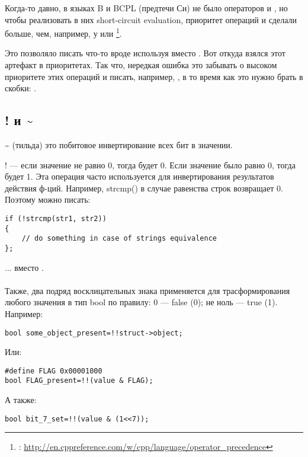 Когда-то давно\cite{dmr:1995}, в языках B и BCPL (предтечи Си) не было операторов \IT{\&\&} и \IT{||}, 
но чтобы реализовать в них
short-circuit evaluation, приоритет операций \IT{\&} и \IT{|} сделали больше, чем, например, у \IT{\^} или \IT{+}
\footnote{: \url{http://en.cppreference.com/w/cpp/language/operator_precedence}}.

Это позволяло писать что-то вроде  используя \IT{\&} вместо \IT{\&\&}. Вот откуда взялся
этот артефакт в приоритетах.
Так что, нередкая ошибка это забывать о высоком приоритете этих операций и писать, например,
, в то время как это нужно брать в скобки: .

\subsection{! и \~{}}

\~{} (тильда) это побитовое инвертирование всех бит в значении.

! --- если значение не равно 0, тогда будет 0. Если значение было равно 0, тогда будет 1. Эта операция часто
используется для инвертирования результатов действия ф-ций. Например, strcmp() в случае равенства строк возвращает 0.
Поэтому можно писать:

\begin{lstlisting}
if (!strcmp(str1, str2))
{
	// do something in case of strings equivalence
};
\end{lstlisting}

... вместо . \\
\\
Также, два подряд восклицательных знака применяется для трасформирования любого значения в тип bool
по правилу: 0 --- false (0); не ноль --- true (1).
Например:

\begin{lstlisting}
bool some_object_present=!!struct->object;
\end{lstlisting}

Или:

\begin{lstlisting}
#define FLAG 0x00001000
bool FLAG_present=!!(value & FLAG);
\end{lstlisting}

А также:

\begin{lstlisting}
bool bit_7_set=!!(value & (1<<7));
\end{lstlisting}

